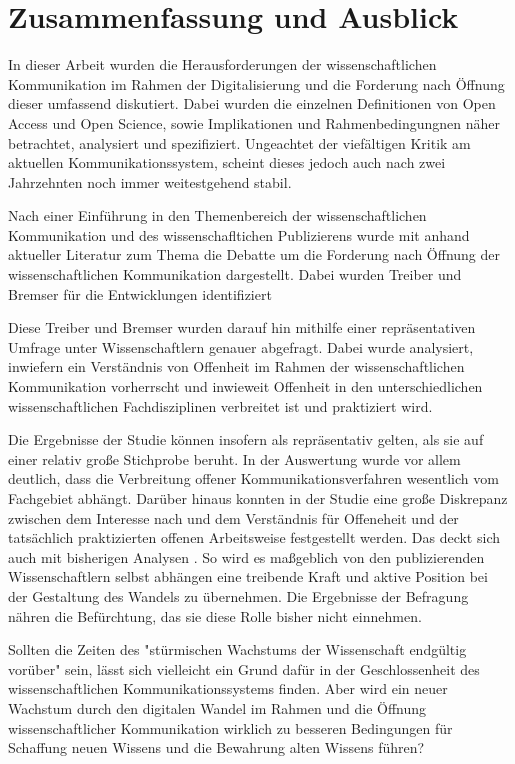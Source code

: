 \chapter{Zusammenfassung und Ausblick}

In dieser Arbeit wurden die Herausforderungen der wissenschaftlichen Kommunikation im Rahmen der Digitalisierung und die Forderung nach Öffnung dieser umfassend diskutiert. Dabei wurden die einzelnen Definitionen von Open Access und Open Science, sowie Implikationen und Rahmenbedingungnen näher betrachtet, analysiert und spezifiziert. Ungeachtet der viefältigen Kritik am aktuellen Kommunikationssystem, scheint dieses jedoch auch nach zwei Jahrzehnten noch immer weitestgehend stabil.

Nach einer Einführung in den Themenbereich der wissenschaftlichen Kommunikation und des wissenschafltichen Publizierens wurde mit anhand aktueller Literatur zum Thema die Debatte um die Forderung nach Öffnung der wissenschaftlichen Kommunikation dargestellt. Dabei wurden Treiber und Bremser für die Entwicklungen identifiziert 

Diese Treiber und Bremser wurden darauf hin mithilfe einer repräsentativen Umfrage unter Wissenschaftlern genauer abgefragt. Dabei wurde analysiert, inwiefern ein Verständnis von Offenheit im Rahmen der wissenschaftlichen Kommunikation vorherrscht und inwieweit Offenheit in den unterschiedlichen wissenschaftlichen Fachdisziplinen verbreitet ist und praktiziert wird.

Die Ergebnisse der Studie können insofern als repräsentativ gelten, als sie auf einer relativ große Stichprobe beruht. In der Auswertung wurde vor allem deutlich, dass die Verbreitung offener Kommunikationsverfahren wesentlich vom Fachgebiet abhängt. Darüber hinaus konnten in der Studie eine große Diskrepanz zwischen dem Interesse nach und dem Verständnis für Offeneheit und der tatsächlich praktizierten offenen Arbeitsweise festgestellt werden. Das deckt sich auch mit bisherigen Analysen \cite{Bartling_2013}. So wird es maßgeblich von den publizierenden Wissenschaftlern selbst abhängen eine treibende Kraft und aktive Position bei der Gestaltung des Wandels zu übernehmen. Die Ergebnisse der Befragung nähren die Befürchtung, das sie diese Rolle bisher nicht einnehmen. 

Sollten die Zeiten des "stürmischen Wachstums der Wissenschaft endgültig vorüber" \cite{K_lbel_2002} sein, lässt sich vielleicht ein Grund dafür in der Geschlossenheit des wissenschaftlichen Kommunikationssystems finden. Aber wird ein neuer Wachstum durch den digitalen Wandel im Rahmen und die Öffnung wissenschaftlicher Kommunikation wirklich zu besseren Bedingungen für Schaffung neuen Wissens und die Bewahrung alten Wissens führen?